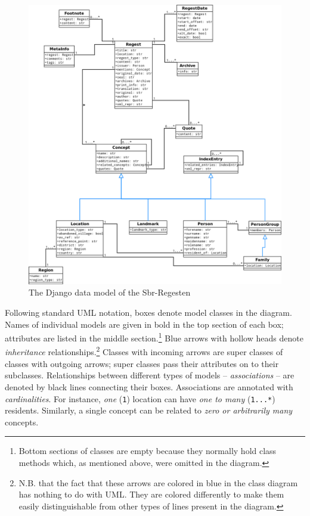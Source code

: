 \begin{figure}[h]
  \centering
  \includegraphics[scale=0.4]{img/data-model}
  \caption{The Django data model of the Sbr-Regesten}
  \label{fig:data-model}
\end{figure}

Following standard UML notation, boxes denote model classes in the
diagram. Names of individual models are given in bold in the top
section of each box; attributes are listed in the middle
section.\footnote{Bottom sections of classes are empty because they
  normally hold class methods which, as mentioned above, were omitted
  in the diagram.} Blue arrows with hollow heads denote
\emph{inheritance} relationships.\footnote{N.B. that the fact that
  these arrows are colored in blue in the class diagram has nothing to
  do with UML. They are colored differently to make them easily
  distinguishable from other types of lines present in the diagram.}
Classes with incoming arrows are super classes of classes with
outgoing arrows; super classes pass their attributes on to their
subclasses. Relationships between different types of models --
\emph{associations} -- are denoted by black lines connecting their
boxes. Associations are annotated with \emph{cardinalities}. For
instance, \emph{one} (\texttt{1}) location can have \emph{one to many}
(\texttt{1...*}) residents. Similarly, a single concept can be related
to \emph{zero or arbitrarily many} concepts.


